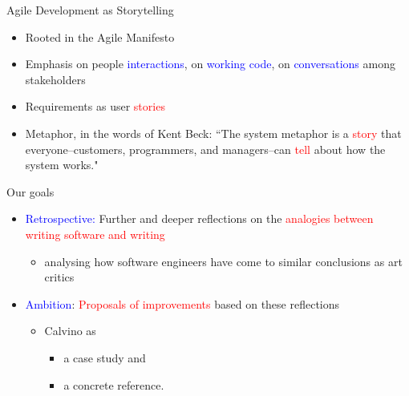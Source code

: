 \documentclass{beamer}
\begin{document}
\begin{frame}
{\centerline{Agile Development as Storytelling}}

\begin{itemize}
\item Rooted in the Agile Manifesto \newline
\item Emphasis on people  \textcolor{blue}{interactions}, on  \textcolor{blue}{working code}, on  \textcolor{blue}{conversations} among stakeholders \newline
\item Requirements as user \textcolor{red}{stories} \newline
\item Metaphor, in the words of Kent Beck: ``The system metaphor is a \textcolor{red}{story} that everyone--customers, programmers, and managers--can \textcolor{red}{tell} about how the system works."
\end{itemize}

\end{frame}



\begin{frame}
{\centerline{Our goals}}
\begin{itemize}
\item \textcolor{blue}{Retrospective:} Further and deeper reflections on the \textcolor{red}{analogies between writing software and writing} 
\begin{itemize}
\item analysing how software engineers have come to similar conclusions as art critics
\end{itemize}
\vspace{0.5cm}
\item \textcolor{blue}{Ambition}: \textcolor{red}{Proposals of improvements} based on these reflections
\begin{itemize}
\item Calvino as 
\begin{itemize}
\item a case study and
\item a concrete reference.
\end{itemize}
\end{itemize}
\end{itemize}

\end{frame}
\end{document}
